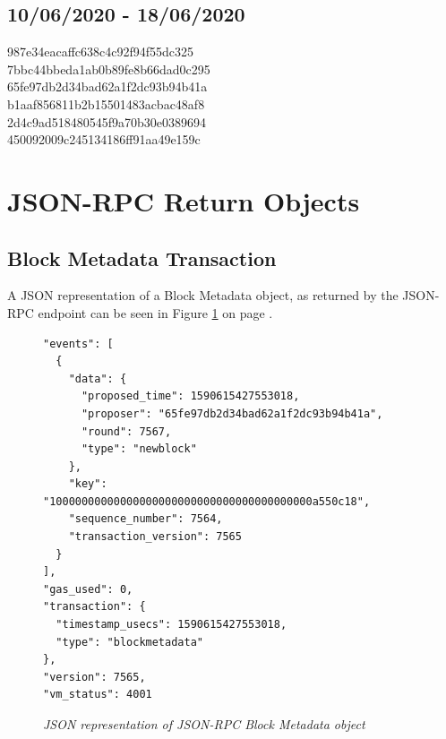 \documentclass[12pt,openany,a4paper]{book}
\begin{document}
\subsection{10/06/2020 - 18/06/2020}
\label{appendix:val_addr_3}
987e34eacaffc638c4c92f94f55dc325 \\
7bbc44bbeda1ab0b89fe8b66dad0c295 \\
65fe97db2d34bad62a1f2dc93b94b41a \\
b1aaf856811b2b15501483acbac48af8 \\
2d4c9ad518480545f9a70b30e0389694 \\
450092009c245134186ff91aa49e159c \\



\section{JSON-RPC Return Objects}

\subsection{Block Metadata Transaction}
\label{appendix:json_txns:bm}
A JSON representation of a Block Metadata object, as returned by the JSON-RPC
endpoint can be seen in Figure \ref{json_rpc_bm} on page \pageref{json_rpc_bm}.
\begin{figure}[h!]
    \caption{\sl JSON representation of JSON-RPC Block Metadata object}
    \centering
    \label{json_rpc_bm}
\begin{verbatim}
"events": [
  {
    "data": {
      "proposed_time": 1590615427553018,
      "proposer": "65fe97db2d34bad62a1f2dc93b94b41a",
      "round": 7567,
      "type": "newblock"
    },
    "key": "10000000000000000000000000000000000000000a550c18",
    "sequence_number": 7564,
    "transaction_version": 7565
  }
],
"gas_used": 0,
"transaction": {
  "timestamp_usecs": 1590615427553018,
  "type": "blockmetadata"
},
"version": 7565,
"vm_status": 4001
\end{verbatim}
\end{figure}
\end{document}
